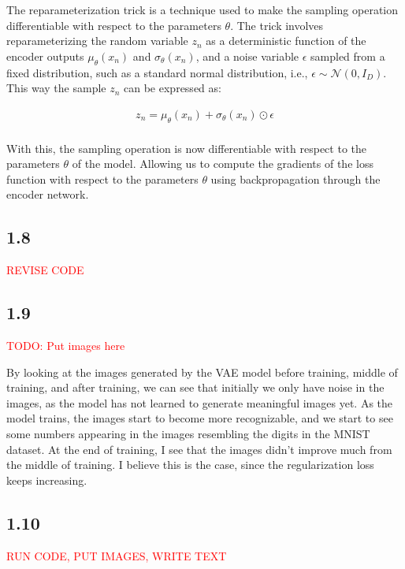 \documentclass{article}
\begin{document}
The reparameterization trick is a technique used to make the sampling operation differentiable with respect to the parameters $\theta$.
The trick involves reparameterizing the random variable $z_n$ as a deterministic function of the encoder outputs
$\mu_{\theta}(x_n)$ and $\sigma_{\theta}(x_n)$, and a noise variable $\epsilon$ sampled from a fixed distribution, such as a standard normal distribution,
i.e., $\epsilon \sim \mathcal{N}(0, I_D)$. This way the sample $z_n$ can be expressed as:

\begin{align*}
    z_n = \mu_{\theta}(x_n) + \sigma_{\theta}(x_n) \odot \epsilon \\
\end{align*}

With this, the sampling operation is now differentiable with respect to the parameters $\theta$ of the model. Allowing
us to compute the gradients of the loss function with respect to the parameters $\theta$ using backpropagation through the
encoder network. 

\subsection*{1.8}

\textcolor{red}{REVISE CODE}

\subsection*{1.9}

\textcolor{red}{TODO: Put images here}

By looking at the images generated by the VAE model before training, middle of training, and after training, we can see that
initially we only have noise in the images, as the model has not learned to generate meaningful images yet. As the model
trains, the images start to become more recognizable, and we start to see some numbers appearing in the images resembling
the digits in the MNIST dataset. At the end of training, I see that the images didn't improve much from the middle of training.
I believe this is the case, since the regularization loss keeps increasing. 

\subsection*{1.10}

\textcolor{red}{RUN CODE, PUT IMAGES, WRITE TEXT}
\end{document}
